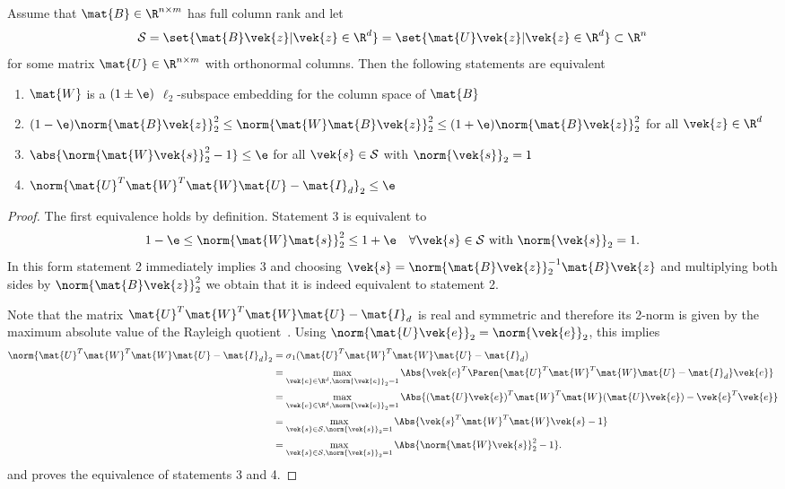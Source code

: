 \begin{theorem}
Assume that \(\mat{B} \in \R^{n \times m}\) has full column rank and let
\[\mathcal{S} = \set{ \mat{B}\vek{z} | \vek{z} \in \R^d } = \set{ \mat{U}\vek{z} | \vek{z} \in \R^d } \subset \R^n\]
for some matrix \(\mat{U} \in \R^{n \times m}\) with orthonormal columns.
Then the following statements are equivalent
\begin{enumerate}
  \item \(\mat{W}\) is a \((1\pm\e)\) \(\ell_2\)-subspace embedding for the column space of \(\mat{B}\)
  \item \((1-\e) \norm{\mat{B}\vek{z}}_2^2 \leq \norm{\mat{W}\mat{B}\vek{z}}_2^2 \leq (1+\e)\norm{\mat{B}\vek{z}}_2^2\) for all \(\vek{z} \in \R^d\)
  \item \(\abs{\norm{\mat{W}\vek{s}}_2^2 - 1} \leq \e\) for all \(\vek{s} \in \mathcal{S}\) with \(\norm{\vek{s}}_2 = 1\)
  \item \(\norm{\mat{U}^T \mat{W}^T \mat{W} \mat{U} - \mat{I}_d}_2 \leq \e\)
\end{enumerate}
\end{theorem}
\begin{proof}
The first equivalence holds by definition. Statement 3 is equivalent to
\[ 1-\e \leq \norm{\mat{W}\mat{s}}_2^2 \leq 1+\e \quad \forall \vek{s} \in \mathcal{S} \text{ with } \norm{\vek{s}}_2 = 1. \]
In this form statement 2 immediately implies 3 and choosing \(\vek{s} = \norm{\mat{B}\vek{z}}_2^{-1} \mat{B}\vek{z}\) and multiplying both sides by \(\norm{\mat{B}\vek{z}}_2^2\) we obtain that it is indeed equivalent to statement 2.

Note that the matrix \(\mat{U}^T \mat{W}^T \mat{W} \mat{U} - \mat{I}_d\) is real and symmetric and therefore its 2-norm is given by the maximum absolute value of the Rayleigh quotient~\cite[Equation (5.2)]{Demmel-AppliedNumericalLinearAlgebra}.
Using \(\norm{\mat{U}\vek{e}}_2 = \norm{\vek{e}}_2\), this implies
\begin{align*}
  \norm{\mat{U}^T \mat{W}^T \mat{W} \mat{U} - \mat{I}_d}_2
  &= \sigma_1(\mat{U}^T \mat{W}^T \mat{W} \mat{U} - \mat{I}_d) \\
  &= \max_{\vek{e} \in \R^d, \norm{\vek{e}}_2 = 1} \Abs{\vek{e}^T \Paren{\mat{U}^T \mat{W}^T \mat{W} \mat{U} - \mat{I}_d} \vek{e} } \\
  &= \max_{\vek{e} \in \R^d, \norm{\vek{e}}_2 = 1} \Abs{{(\mat{U}\vek{e})}^T \mat{W}^T \mat{W} (\mat{U}\vek{e}) - \vek{e}^T \vek{e}} \\
  &= \max_{\vek{s} \in \mathcal{S}, \norm{\vek{s}}_2 = 1} \Abs{\vek{s}^T \mat{W}^T \mat{W} \vek{s} - 1} \\
  &= \max_{\vek{s} \in \mathcal{S}, \norm{\vek{s}}_2 = 1} \Abs{\norm{\mat{W}\vek{s}}_2^2 - 1}.
\end{align*}
and proves the equivalence of statements 3 and 4.
\end{proof}

